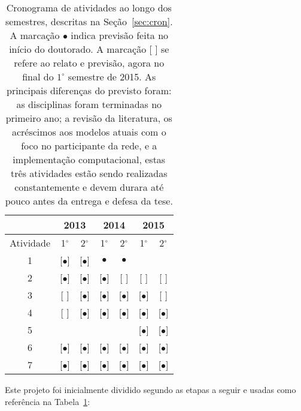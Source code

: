 \documentclass[a4paper,openright,12pt]{report} %
\begin{document}
\begin{table}[h]
\begin{center}
  \caption{Cronograma de atividades ao longo dos semestres, descritas na Seção~\ref{sec:cron}.
	  A marcação $\bullet$ indica previsão feita no início do doutorado.
  A marcação [ ] se refere ao relato e previsão, agora no final do $1^{\circ}$ semestre de 2015.
  As principais diferenças do previsto foram: as disciplinas foram terminadas no primeiro ano; a revisão da literatura, os acréscimos aos modelos atuais com o foco no participante da rede, e a implementação computacional, estas três atividades estão sendo realizadas constantemente e devem durara até pouco antes da entrega e defesa da tese. }
\label{tab:cron}
  \begin{tabular}{ | c ||   c | c |     c | c |   c | c |}
    \hline
      & \multicolumn{2}{|c|}{2013} & \multicolumn{2}{|c|}{2014} & \multicolumn{2}{|c|}{2015} \\
    \hline
    Atividade & 1$^{\circ}$ & 2$^{\circ}$ & 1$^{\circ}$ & 2$^{\circ}$ & 1$^{\circ}$ & 2$^{\circ}$ \\
    \hline \hline

    1 & [$\bullet$] & [$\bullet$] & $\bullet$ & $\bullet$ & & \\
    \hline
    2 & [$\bullet$] & [$\bullet$] & [$\bullet$] & [ ] & [ ] & [ ] \\
    \hline
    3 & [ ] & [$\bullet$] & [$\bullet$] & [$\bullet$] & [$\bullet$] & [ ]  \\
    \hline
    4 & [ ] & [$\bullet$] & [$\bullet$] & [$\bullet$] & [$\bullet$] & [$\bullet$]  \\
    \hline
    5 & & & & & [$\bullet$] & [$\bullet$]  \\
    \hline
    6 & [$\bullet$] & [$\bullet$] & [$\bullet$] & [$\bullet$] & [$\bullet$] & [$\bullet$]  \\
    \hline
    7 & [$\bullet$] & [$\bullet$] & [$\bullet$] & [$\bullet$] & [$\bullet$] & [$\bullet$]  \\
    \hline
  \end{tabular}
\end{center}
\end{table}


Este projeto foi inicialmente dividido segundo as etapas a seguir 
e usadas como referência na Tabela~\ref{tab:cron}:
\end{document}
